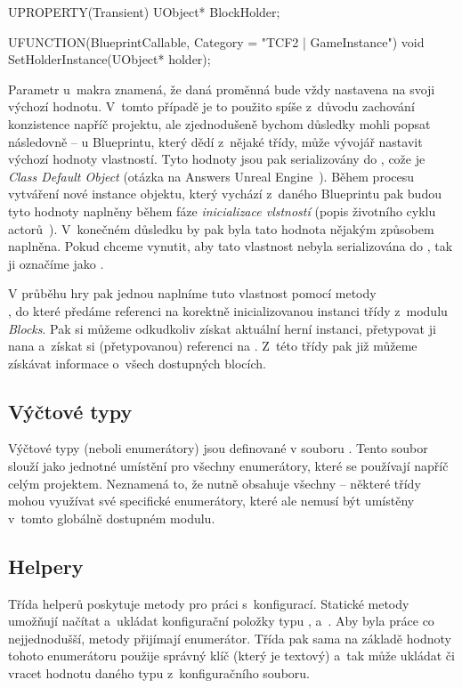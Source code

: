 \begin{code}
	UPROPERTY(Transient)
		UObject* BlockHolder;

	UFUNCTION(BlueprintCallable, Category = "TCF2 | GameInstance")
		void SetHolderInstance(UObject* holder);
\end{code}



 Parametr  u~makra  znamená, že daná proměnná bude vždy nastavena na svoji výchozí hodnotu. V~tomto případě je to použito spíše z~důvodu zachování konzistence napříč projektu, ale zjednodušeně bychom důsledky mohli popsat následovně -- u Blueprintu, který dědí z~nějaké \CPP{} třídy, může vývojář nastavit výchozí hodnoty vlastností. Tyto hodnoty jsou pak serializovány do \CDO{}, cože je \textit{Class Default Object} (otázka na Answers Unreal Engine~\citep{ue_cdo}). Během procesu vytváření nové instance objektu, který vychází z~daného Blueprintu pak budou tyto hodnoty naplněny během fáze \textit{inicializace vlstností} (popis životního cyklu actorů~\citep{ue_actor_life}). V~konečném důsledku by pak byla tato hodnota nějakým způsobem naplněna. Pokud chceme vynutit, aby tato vlastnost nebyla serializována do \CDO{}, tak ji označíme jako .

V průběhu hry pak jednou naplníme tuto vlastnost pomocí metody\\ , do které předáme referenci na korektně inicializovanou instanci třídy  z~modulu \textit{Blocks}. Pak si můžeme odkudkoliv získat aktuální herní instanci, přetypovat ji nana  a~získat si (přetypovanou) referenci na . Z~této třídy pak již můžeme získávat informace o~všech dostupných blocích.

\subsection{Výčtové typy}

Výčtové typy (neboli enumerátory) jsou definované v souboru . Tento soubor slouží jako jednotné umístění pro všechny enumerátory, které se používají napříč celým projektem. Neznamená to, že nutně obsahuje všechny -- některé třídy mohou využívat své specifické enumerátory, které ale nemusí být umístěny v~tomto globálně dostupném modulu.


\subsection{Helpery}

Třída helperů  poskytuje metody pro práci s~konfigurací. Statické metody umožňují načítat a~ukládat konfigurační položky typu ,  a~.
Aby byla práce co nejjednodušší, metody přijímají enumerátor\linebreak[4]. Třída pak sama na základě hodnoty tohoto enumerátoru použije správný klíč (který je textový) a~tak může ukládat či vracet hodnotu daného typu z~konfiguračního souboru.